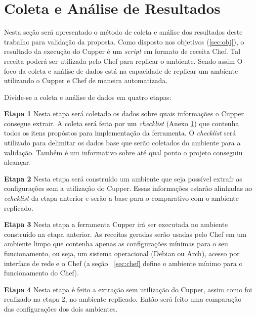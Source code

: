 \section{Coleta e Análise de Resultados}

Nesta seção será apresentado o método de coleta e análise dos resultados deste
trabalho para validação da proposta. Como disposto nos objetivos (\ref{sec:obj}),
o resultado da execução do Cupper é um \textit{script} em formato de receita Chef.
Tal receita poderá ser utilizada pelo Chef para replicar o ambiente. Sendo assim
O foco da coleta e análise de dados está na capacidade de replicar um ambiente
utilizando o Cupper e Chef de maneira automatizada.

Divide-se a coleta e análise de dados em quatro etapas:

\textbf{Etapa 1} %
Nesta etapa será coletado os dados sobre quais informações o Cupper consegue
extrair. A coleta será feita por um \textit{checklist} (Anexo \ref{}) que contenha %
todos os itens propóstos para implementação da ferramenta. O \textit{checklist} será
utilizado para delimitar os dados base que serão coletados do ambiente para
a validação. Também é um informativo sobre até qual ponto o projeto conseguiu
alcançar.

\textbf{Etapa 2} %
Nesta etapa será construído um ambiente que seja possível extraír as configurações
sem a utilização do Cupper. Essas informações estarão alinhadas ao \textit{cehcklist} da etapa
anterior e serão a base para o comparativo com o ambiente replicado.

\textbf{Etapa 3} %
Nesta etapa a ferramenta Cupper irá ser executada no ambiente construído na etapa
anterior. As receitas geradas serão usadas pelo Chef em um ambiente limpo que contenha
apenas as configurações mínimas para o seu funcionamento, ou seja, um sistema
operacional (Debian ou Arch), acesso por interface de rede e o Chef (a seção
~\ref{sec:chef} define o ambiente mínimo para o funcionamento do Chef).

\textbf{Etapa 4} %
Nesta etapa é feito a extração sem utilização do Cupper, assim como foi realizado
na etapa 2, no ambiente replicado. Então será feito uma comparação das configurações
dos dois ambientes. %
